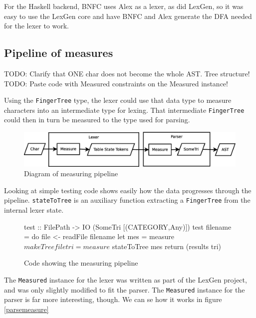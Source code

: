 \documentclass[a4paper,12pt,twosided]{report}
\begin{document}
For the Haskell backend, BNFC uses Alex as a lexer, as did LexGen, so it was
easy to use the LexGen core and have BNFC and Alex generate the DFA needed for
the lexer to work. 

\subsection{Pipeline of measures}
\label{pipeline}
TODO: Clarify that ONE char does not become the whole AST. Tree structure!
TODO: Paste code with Measured constraints on the Measured instance!

Using the \texttt{FingerTree} type, the lexer could use that data type to
measure characters into an intermediate type for lexing. That intermediate
\texttt{FingerTree} could then in turn be measured to the type used for parsing.

\begin{figure}[H]
\includegraphics[width=\textwidth]{pipeline.eps}
\caption{Diagram of measuring pipeline}
\end{figure}

Looking at simple testing code shows easily how the data progresses through the
pipeline. \texttt{stateToTree} is an auxiliary function extracting a
\texttt{FingerTree} from the internal lexer state.

\begin{figure}[H]
\begin{code}
test :: FilePath -> IO (SomeTri [(CATEGORY,Any)])
test filename = do
    file <- readFile filename
    let mes = measure $ makeTree file
        tri = measure $ stateToTree mes
    return (results tri)
\end{code} 
\caption{Code showing the measuring pipeline}
\end{figure}

The \texttt{Measured} instance for the lexer was written as part of the LexGen
project, and was only slightly modified to fit the parser. The \texttt{Measured}
instance for the parser is far more interesting, though. We can se how it works
in figure \ref{parsemeasure}
\end{document}
